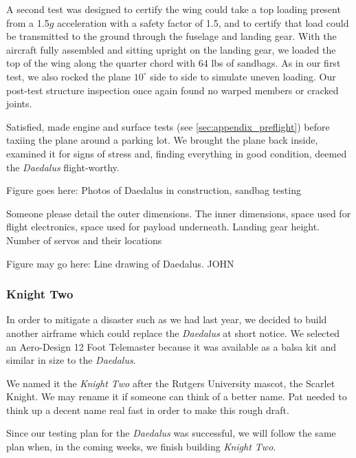 \documentclass[10pt]{report}
\newcommand{\degrees}[1]
{
\begin{math}
#1^{\circ} 
\end{math}
}
\begin{document}
A second test was designed to certify the wing could take a top loading present from a 1.5$g$ acceleration with a safety factor of 1.5, and to certify that load could be transmitted to the ground through the fuselage and landing gear. With the aircraft fully assembled and sitting upright on the landing gear, we loaded the top of the wing along the quarter chord with 64 lbs of sandbags. As in our first test, we also rocked the plane \degrees{10} side to side to simulate uneven loading. Our post-test structure inspection once again found no warped members or cracked joints.

Satisfied, made engine and surface tests (see \ref{sec:appendix_preflight}) before taxiing the plane around a parking lot.  We brought the plane back inside, examined it for signs of stress and, finding everything in good condition, deemed the \emph{Daedalus} flight-worthy.

Figure goes here: Photos of Daedalus in construction, sandbag testing

Someone please detail the outer dimensions. The inner dimensions, space used for flight electronics, space used for payload underneath. Landing gear height. Number of servos and their locations

Figure may go here: Line drawing of Daedalus. JOHN

\subsubsection{Knight Two}

In order to mitigate a disaster such as we had last year, we decided to build another airframe which could replace the \emph{Daedalus} at short notice. We selected an Aero-Design 12 Foot Telemaster \cite{aerodesign} because it was available as a balsa kit and similar in size to the \emph{Daedalus}.

We named it the \emph{Knight Two} after the Rutgers University mascot, the Scarlet Knight. We may rename it if someone can think of a better name. Pat needed to think up a decent name real fast in order to make this rough draft.

Since our testing plan for the \emph{Daedalus} was successful, we will follow the same plan when, in the coming weeks, we finish building \emph{Knight Two}.
\end{document}
